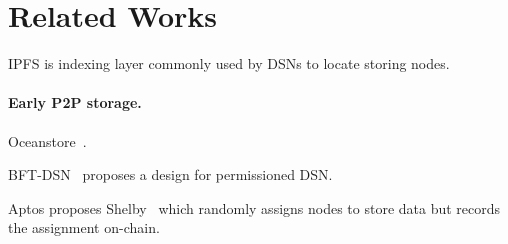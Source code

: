 \section{Related Works}
\label{sec:rel}

IPFS is indexing layer commonly used by DSNs to locate storing nodes.

\paragraph{Early P2P storage.}
Oceanstore~\cite{oceanstore}.

BFT-DSN~\cite{bft-dsn} proposes a design for permissioned DSN.

Aptos proposes Shelby~\cite{shelby} which randomly assigns nodes to store data but records the assignment on-chain.